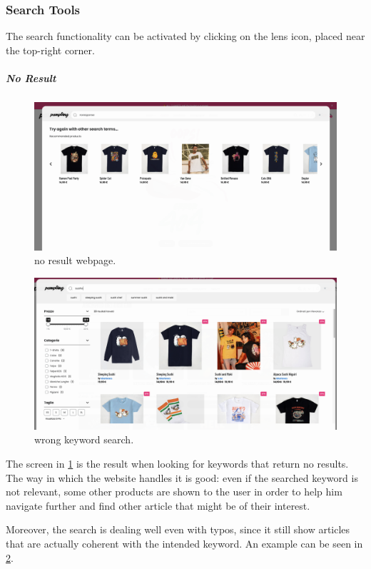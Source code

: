 \subsubsection{Search Tools}
The search functionality can be activated by clicking on the lens icon, placed near the top-right corner.


\subparagraph{No Result}
\begin{figure}[h!]
	\centering
	\includegraphics[scale=0.225]{images/zero-res.png}
	\caption{no result webpage.}
	\label{fig:zero-res}
\end{figure}

\begin{figure}[h!]
	\centering
	\includegraphics[scale=0.225]{images/wrong-search.png}
	\caption{wrong keyword search.}
	\label{fig:wrong-search}
\end{figure}

The screen in \cref{fig:zero-res} is the result when looking for keywords that return no results.
The way in which the website handles it is good: even if the searched keyword is not relevant, some other products are shown
to the user in order to help him navigate further and find other article that might be of their interest.

Moreover, the search is dealing well even with typos, since it still show articles that are actually coherent with the 
intended keyword. An example can be seen in \cref{fig:wrong-search}.

